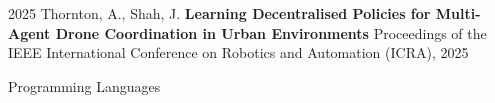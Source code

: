 \documentclass{cv}
\begin{document}
    \entryParagraph
        {2025}
        {Thornton, A., Shah, J.}
        {\textbf{Learning Decentralised Policies for Multi-Agent Drone Coordination in Urban Environments}}
        {
            Proceedings of the IEEE International Conference on Robotics and Automation (ICRA), 2025
        }
\sectionEnd

    {Programming Languages}
    {
    }
    {
    }
\end{document}
